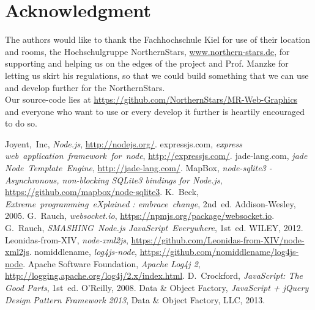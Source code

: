 \documentclass[journal]{IEEEtran}
\begin{document}
\section*{Acknowledgment}
The authors would like to thank the Fachhochschule Kiel for use of their location and rooms, the Hochschulgruppe NorthernStars, \url{www.northern-stars.de}, for supporting and helping us on the edges of the project and Prof. Manzke for letting us skirt his regulations, so that we could build something that we can use and develop further for the NorthernStars.\\
Our source-code lies at \url{https://github.com/NorthernStars/MR-Web-Graphics} and everyone who want to use or every develop it further is heartily encouraged to do so.

\begin{thebibliography}{1}

Joyent,~Inc, \emph{Node.js}, \url{http://nodejs.org/}.
expressjs.com, \emph{express web~application~framework~for~node}, \url{http://expressjs.com/}.
jade-lang.com, \emph{jade Node~Template~Engine}, \url{http://jade-lang.com/}.
MapBox, \emph{node-sqlite3 - Asynchronous, non-blocking SQLite3 bindings for Node.js}, \url{https://github.com/mapbox/node-sqlite3}.
K.~Beck, \emph{Extreme~programming~eXplained : embrace~change}, 2nd~ed. Addison-Wesley, 2005.
G.~Rauch, \emph{websocket.io}, \url{https://npmjs.org/package/websocket.io}.
G.~Rauch, \emph{SMASHING~Node.js JavaScript~Everywhere}, 1st~ed. WILEY, 2012.
Leonidas-from-XIV, \emph{node-xml2js}, \url{https://github.com/Leonidas-from-XIV/node-xml2js}.
nomiddlename, \emph{log4js-node}, \url{https://github.com/nomiddlename/log4js-node}.
Apache Software Foundation, \emph{Apache Log4j 2}, \url{http://logging.apache.org/log4j/2.x/index.html}.
D.~Crockford, \emph{JavaScript: The Good Parts}, 1st~ed. O'Reilly, 2008.
Data & Object Factory, \emph{JavaScript + jQuery Design Pattern Framework 2013}, Data & Object Factory, LLC, 2013.

\end{thebibliography}
\end{document}

